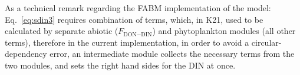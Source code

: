 \documentclass[gmd, manuscript, draft]{copernicus}
\begin{document}
As a technical remark regarding the FABM implementation of the model: Eq.~\eqref{eq:sdin3} requires combination of terms, which, in K21, used to be calculated by separate abiotic ($F_{\text{DON}-\text{DIN}}$) and phytoplankton modules (all other terms), therefore in the current implementation, in order to avoid a circular-dependency error, an intermediate module collects the necessary terms from the two modules, and sets the right hand sides for the DIN at once.
\end{document}

